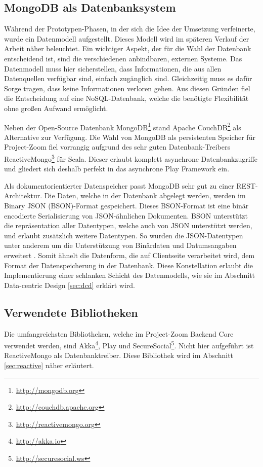 \subsection{MongoDB als Datenbanksystem}
Während der Prototypen-Phasen, in der sich die Idee der Umsetzung verfeinerte, wurde ein Datenmodell aufgestellt. Dieses Modell wird im späteren Verlauf der Arbeit näher beleuchtet. Ein wichtiger Aspekt, der für die Wahl der Datenbank entscheidend ist, sind die verschiedenen anbindbaren, externen Systeme. Das Datenmodell muss hier sicherstellen, dass Informationen, die aus allen Datenquellen verfügbar sind, einfach zugänglich sind. Gleichzeitig muss es dafür Sorge tragen, dass keine Informationen verloren gehen. Aus diesen Gründen fiel die Entscheidung auf eine NoSQL-Datenbank, welche die benötigte Flexibilität ohne großen Aufwand ermöglicht.

Neben der Open-Source Datenbank MongoDB\footnote{\url{http://mongodb.org}} stand Apache CouchDB\footnote{\url{http://couchdb.apache.org}} als Alternative zur Verfügung. Die Wahl von MongoDB als persistenten Speicher für Project-Zoom fiel vorrangig aufgrund des sehr guten Datenbank-Treibers ReactiveMongo\footnote{\url{http://reactivemongo.org}} für Scala. Dieser erlaubt komplett asynchrone Datenbankzugriffe und gliedert sich deshalb perfekt in das asynchrone Play Framework ein.

Als dokumentorientierter Datenspeicher passt MongoDB sehr gut zu einer REST-Architektur. Die Daten, welche in der Datenbank abgelegt werden, werden im Binary JSON (BSON)-Format gespeichert. Dieses BSON-Format ist eine binär encodierte Serialisierung von JSON-ähnlichen Dokumenten. BSON unterstützt die repräsentation aller Datentypen, welche auch von JSON unterstützt werden, und erlaubt zusätzlich weitere Datentypen. So wurden die JSON-Datentypen unter anderem um die Unterstützung von Binärdaten und Datumsangaben erweitert \cite{bson}. Somit ähnelt die Datenform, die auf Clientseite verarbeitet wird, dem Format der Datenspeicherung in der Datenbank. Diese Konstellation erlaubt die Implementierung einer schlanken Schicht des Datenmodells, wie sie im Abschnitt Data-centric Design \ref{sec:dcd} erklärt wird.

\subsection{Verwendete Bibliotheken}
Die umfangreichsten Bibliotheken, welche im Project-Zoom Backend Core verwendet werden, sind Akka\footnote{\url{http://akka.io}}, Play und SecureSocial\footnote{\url{http://securesocial.ws}}. Nicht hier aufgeführt ist ReactiveMongo als Datenbanktreiber. Diese Bibliothek wird im Abschnitt \ref{sec:reactive} näher erläutert. 

